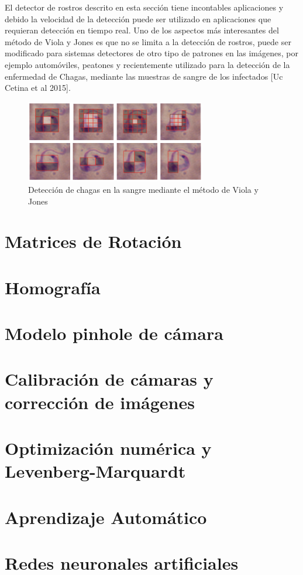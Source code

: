    El detector de rostros descrito en esta sección tiene incontables aplicaciones y debido la velocidad de la detección puede ser utilizado en aplicaciones que requieran detección en tiempo real. Uno de los aspectos más interesantes del método de Viola y Jones es que no se limita a la detección de rostros, puede ser modificado para sistemas detectores de otro tipo de patrones en las imágenes, por ejemplo automóviles, peatones y recientemente utilizado para la detección de la enfermedad de Chagas, mediante las muestras de sangre de los infectados [Uc Cetina et al 2015].
   \begin{figure}[htbp]
   	\centering
   	\includegraphics[width=0.7\textwidth]{./pictures/chagas}
   	\caption{Detección de chagas en la sangre mediante el método de Viola y Jones}\label{fig: figura}
   \end{figure}
   
   \section{Matrices de Rotación}
   \section{Homografía}
   \section{Modelo pinhole de cámara}
   \section{Calibración de cámaras y corrección de imágenes}
   \section{Optimización numérica y Levenberg-Marquardt}
   \section{Aprendizaje Automático}
   \section{Redes neuronales artificiales}
